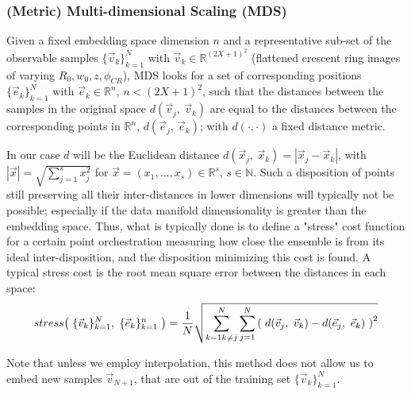\documentclass[11pt, a4paper, twoside]{article} %
\newcommand{\R}{\mathbb{R}} %
\newcommand{\N}{\mathbb{N}}
\DeclareRobustCommand{\mybox}[2][gray!10]{%
\begin{tcolorbox}[   %
        left=0.2cm,
        right=0.2cm,
        top=0.15cm,
        bottom=0.15cm,
        colback=#1,
        colframe=#1,
        width=\dimexpr\textwidth\relax, 
        enlarge left by=0mm,
        boxsep=5pt,
        arc=0pt,outer arc=0pt,
        ]
        #2
\end{tcolorbox}
}
\begin{document}
\subsubsection*{(Metric) Multi-dimensional Scaling (MDS)}
Given a fixed embedding space dimension $n$ and a representative sub-set of the observable samples $\{\vec{v}_k\}_{k=1}^{N}$ with $\vec{v}_k\in\R^{(2X+1)^2}$ (flattened crescent ring images of varying $R_0,w_0,z,\phi_{CR}$), MDS \cite{MDS} looks for a set of corresponding positions $\{ \vec{e}_k \}_{k=1}^N$ with $\vec{e}_k\in\R^n$, $n<(2X+1)^2$, such that the distances between the samples in the original space $d(\vec{v}_j,\ \vec{v}_k)$ are equal to the distances between the corresponding points in $\R^n$, $d(\vec{e}_j,\ \vec{e}_k)$; with $d(\cdot,\cdot)$ a fixed distance metric.
\mybox{ In our case $d$ will be the Euclidean distance $d(\vec{x}_j,\ \vec{x}_k)=|\vec{x}_j-\vec{x}_k|$, with $|\vec{x}|=\sqrt{\sum_{j=1}^s x_j^2}$ for $\vec{x}=(x_1,...,x_s)\in\R^s$, $s\in\N$. Such a disposition of points still preserving all their inter-distances in lower dimensions will typically not be possible; especially if the data manifold dimensionality is greater than the embedding space. Thus, what is typically done is to define a "stress" cost function for a certain point orchestration measuring how close the ensemble is from its ideal inter-disposition, and the disposition minimizing this cost is found. A typical stress cost is the root mean square error between the distances in each space:\vspace{-0.3cm}
\begin{equation}\small
stress\qty(\ \{\vec{v}_k\}_{k=1}^N,\ \{\vec{e}_k\}_{k=1}^n\ )=\frac{1}{N}\sqrt{\sum_{k=1\\ k\neq j}^N\sum_{j=1}^N\qty(\ d(\vec{v}_j,\ \vec{v}_k)-d(\vec{e}_j,\ \vec{e}_k)\ )^2}\vspace{-0.2cm}
\end{equation}

Note that unless we employ interpolation, this method does not allow us to embed new samples $\vec{v}_{N+1}$, that are out of the training set $\{\vec{v}_k\}_{k=1}^N$.%
}
\end{document}
